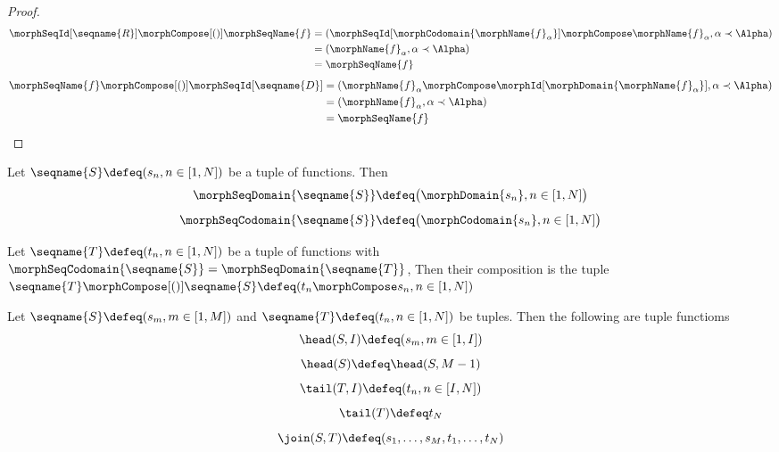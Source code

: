 \documentclass{article}
\begin{document}
\begin{lemma}
\begin{proof}
\begin{equation*}
\begin{split}
  \morphSeqId[\seqname{R}] \morphCompose[()] \morphSeqName{f}
  & =
  (\morphSeqId[\morphCodomain{\morphName{f}_\alpha}] \morphCompose \morphName{f}_\alpha,
  \alpha \prec \Alpha)
\\*
  & =
  (\morphName{f}_\alpha, \alpha \prec \Alpha)
\\*
  & =
  \morphSeqName{f}
\end{split}
\end{equation*}
\begin{equation*}
\begin{split}
  \morphSeqName{f} \morphCompose[()] \morphSeqId[\seqname{D}]
  & =
  (\morphName{f}_\alpha \morphCompose \morphId[\morphDomain{\morphName{f}_\alpha}],
  \alpha \prec \Alpha)
\\*
  & =
  (\morphName{f}_\alpha, \alpha \prec \Alpha)
\\*
  & =
  \morphSeqName{f}
\end{split}
\end{equation*}
\end{proof}
\end{lemma}

\begin{definition}
Let $\seqname{S} \defeq (s_n, n \in [1,N])$ be a tuple of functions. Then
\begin{equation}
\morphSeqDomain{\seqname{S}} \defeq \bigl ( \morphDomain{s_n}, n \in [1,N] \bigr )
\end{equation}
\begin{equation}
\morphSeqCodomain{\seqname{S}} \defeq \bigl ( \morphCodomain{s_n}, n \in [1,N] \bigr )
\end{equation}

Let $\seqname{T} \defeq (t_n, n \in [1,N])$ be a tuple of functions with
$\morphSeqCodomain{\seqname{S}}=\morphSeqDomain{\seqname{T}}$,
Then their composition is the tuple
$
  \seqname{T} \morphCompose[()] \seqname{S} \defeq
  (t_n \morphCompose s_n, n \in [1,N])
$

Let $\seqname{S} \defeq (s_m, m \in [1,M])$ and
$\seqname{T} \defeq (t_n, n \in [1,N])$ be tuples.
Then the following are tuple functioms
\begin{equation}
\head(S,I) \defeq (s_m, m \in [1,I])
\end{equation}
\begin{equation}
\head(S) \defeq \head(S,M-1)
\end{equation}
\begin{equation}
\tail(T,I) \defeq (t_n, n \in [I,N])
\end{equation}
\begin{equation}
\tail(T) \defeq t_N
\end{equation}
\begin{equation}
\join(S,T) \defeq (s_1, \dots, s_M, t_1, \dots, t_N)
\end{equation}
\end{definition}
\end{document}

